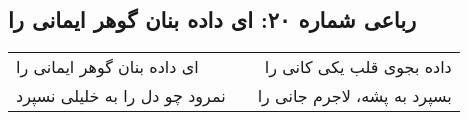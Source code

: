 \begin{center}
\section*{رباعی شماره ۲۰: ای داده بنان گوهر ایمانی را}
\label{sec:0020}
\begin{longtable}{l p{0.5cm} r}
ای داده بنان گوهر ایمانی را
&&
داده بجوی قلب یکی کانی را
\\
نمرود چو دل را به خلیلی نسپرد
&&
بسپرد به پشه، لاجرم جانی را
\\
\end{longtable}
\end{center}
